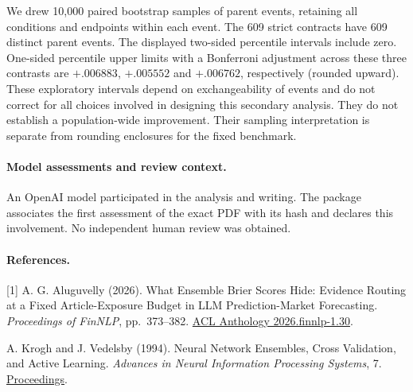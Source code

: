 \documentclass[11pt]{article}
\begin{document}
We drew 10,000 paired bootstrap samples of parent events, retaining all conditions and endpoints within each event. The 609 strict contracts have 609 distinct parent events. The displayed two-sided percentile intervals include zero. One-sided percentile upper limits with a Bonferroni adjustment across these three contrasts are $+.006883$, $+.005552$ and $+.006762$, respectively (rounded upward). These exploratory intervals depend on exchangeability of events and do not correct for all choices involved in designing this secondary analysis. They do not establish a population-wide improvement. Their sampling interpretation is separate from rounding enclosures for the fixed benchmark.

\paragraph{Model assessments and review context.}
An OpenAI model participated in the analysis and writing. The package associates the first assessment of the exact PDF with its hash and declares this involvement. No independent human review was obtained.

\paragraph{References.}
[1] A. G. Aluguvelly (2026). What Ensemble Brier Scores Hide: Evidence Routing at a Fixed Article-Exposure Budget in LLM Prediction-Market Forecasting. \emph{Proceedings of FinNLP}, pp.\ 373--382. \href{https://aclanthology.org/2026.finnlp-1.30/}{ACL Anthology 2026.finnlp-1.30}.

\smallskip\noindent
[2] A. Krogh and J. Vedelsby (1994). Neural Network Ensembles, Cross Validation, and Active Learning. \emph{Advances in Neural Information Processing Systems}, 7. \href{https://papers.nips.cc/paper_files/paper/1994/hash/b8c37e33defde51cf91e1e03e51657da-Abstract.html}{Proceedings}.
\end{document}
